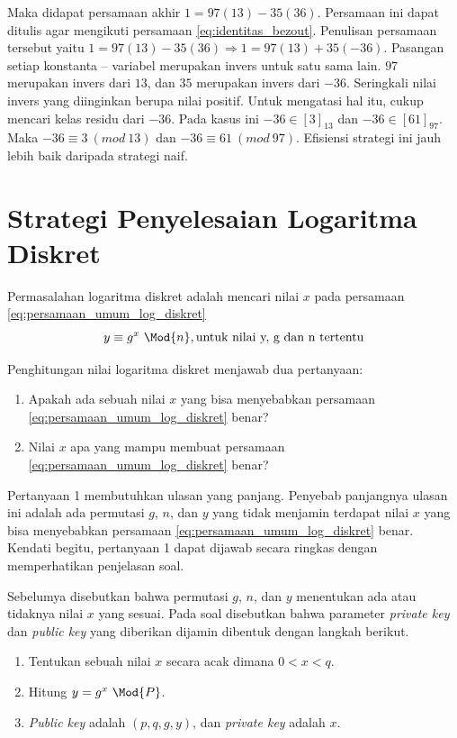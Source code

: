 Maka didapat persamaan akhir $ 1=97(13)-35(36) $. Persamaan ini dapat ditulis agar mengikuti persamaan \eqref{eq:identitas_bezout}. Penulisan persamaan tersebut yaitu $ 1=97(13)-35(36) \Rightarrow 1=97(13)+35(-36) $. Pasangan setiap konstanta -- variabel merupakan invers untuk satu sama lain. $ 97 $ merupakan invers dari $ 13 $, dan $ 35 $ merupakan invers dari $ -36 $. Seringkali nilai invers yang diinginkan berupa nilai positif. Untuk mengatasi hal itu, cukup mencari kelas residu dari $ -36 $. Pada kasus ini $ -36\in[3]_{13}$ dan $ -36\in[61]_{97} $. Maka $ -36\equiv3\ (mod\ 13) $ dan $ -36\equiv61\ (mod\ 97) $.
Efisiensi strategi ini jauh lebih baik daripada strategi naif.

\section{Strategi Penyelesaian Logaritma Diskret}

Permasalahan logaritma diskret adalah mencari nilai $ x $ pada persamaan \eqref{eq:persamaan_umum_log_diskret}
\[
y \equiv g^{x}\ \Mod{n},\text{untuk nilai y, g dan n tertentu}
\]

Penghitungan nilai logaritma diskret menjawab dua pertanyaan:
\begin{enumerate}
\item Apakah ada sebuah nilai $ x $ yang bisa menyebabkan persamaan \eqref{eq:persamaan_umum_log_diskret} benar?
\item Nilai $ x $ apa yang mampu membuat persamaan \eqref{eq:persamaan_umum_log_diskret} benar?
\end{enumerate}

Pertanyaan 1 membutuhkan ulasan yang panjang. Penyebab panjangnya ulasan ini adalah ada permutasi $ g $, $ n $, dan $ y $ yang tidak menjamin terdapat nilai $ x $ yang bisa menyebabkan persamaan \eqref{eq:persamaan_umum_log_diskret} benar. Kendati begitu, pertanyaan 1 dapat dijawab secara ringkas dengan memperhatikan penjelasan soal. 

Sebelumya disebutkan bahwa permutasi $ g $, $ n $, dan $ y $ menentukan ada atau tidaknya nilai $ x $ yang sesuai. Pada soal disebutkan bahwa parameter \textit{private key} dan \textit{public key} yang diberikan dijamin dibentuk dengan langkah berikut.

\begin{enumerate}
\item Tentukan sebuah nilai $ x $ secara acak dimana $ 0 < x < q $.
\item Hitung $ y = g^x\ \Mod{P} $.
\item \textit{Public key} adalah $ (p, q, g, y) $, dan \textit{private key} adalah $ x $.
\end{enumerate}

